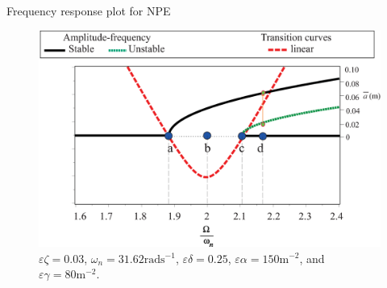 \documentclass[LaTeX2e,10pt]{beamer}
\begin{document}
\begin{frame}{Frequency response plot for NPE}
	\begin{figure}[h!]
		\centering
		\includegraphics[width=\linewidth]{Images/4/NonlinEpsilonTransfer1-3.eps}
		\caption{$\varepsilon \zeta = 0.03$, $\omega_n = 31.62\mathrm{rad s^{-1}}$, $\varepsilon \delta = 0.25$, $\varepsilon \alpha = 150 \mathrm{m^{-2}}$, and $\varepsilon \gamma = 80 \mathrm{m^{-2}}$.}
	\end{figure}
\end{frame}
\end{document}
